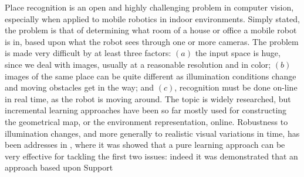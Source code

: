 Place recognition is an open and highly challenging problem in
computer vision, especially when applied to mobile robotics in indoor
environments. Simply stated, the problem is that of determining what
room of a house or office a mobile robot is in, based upon what the
robot sees through one or more cameras. The problem is made very
difficult by at least three factors: $(a)$ the input space is huge,
since we deal with images, usually at a reasonable resolution and in
color; $(b)$ images of the same place can be quite different as
illumination conditions change and moving obstacles get in the way;
and $(c)$, recognition must be done on-line in real time, as the robot
is moving around.
The topic is  widely researched, but
incremental learning approaches have been so far mostly used for constructing the
geometrical map, or the environment representation, online\cite{emma:irca05, ljubjiana:icra02}.
Robustness to illumination changes, and more generally to realistic
visual variations in time, has been addresses in \cite{pronobis:iros06}, where it was showed that
a pure learning approach can be very effective 
for tackling the first two
issues: indeed it was demonstrated that an approach based upon Support
